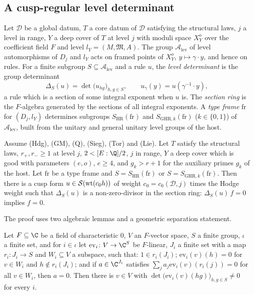 \subsection{A cusp-regular level determinant}\label{pf:lift1:cusp}

Let $\mathcal D$ be a global datum, $T$ a core datum of $\mathcal D$ satisfying the structural laws, $j$ a
level in range, $Y$ a deep cover of $T$ at level $j$ with moduli space $X^o_Y$ over the coefficient field
$F$ and level $l_Y=(M,\mathfrak M,A)$. The group $\mathcal A_{\mathrm{lev}}$ of level automorphisms of $D_j$ and
$l_Y$ acts on framed points of $X^o_Y$, $y\mapsto\gamma\cdot y$, and hence on rules. For a finite subgroup
$S\subseteq\mathcal A_{\mathrm{lev}}$ and a rule $u$, the \emph{level determinant} is the group determinant
\[
\Delta_S(u)=\det\bigl(u_{hg}\bigr)_{h,g\in S},\qquad u_\gamma(y)=u(\gamma^{-1}\cdot y),
\]
a rule which is a section of some integral exponent when $u$ is. The \emph{section ring} is the
$F$-algebra generated by the sections of all integral exponents. A \emph{type frame} $\mathrm{fr}$ for
$(D_j,l_Y)$ determines subgroups $S_{\mathrm{HR}}(\mathrm{fr})$ and $S_{\mathrm{GHR},k}(\mathrm{fr})$
($k\in\{0,1\}$) of $\mathcal A_{\mathrm{lev}}$, built from the unitary and general unitary level groups of the
host.

\begin{theorem}\label{pf:lift1:cusp-thm}
Assume (Hdg), (GM), (Q), (Sieg), (Tor) and (Lie). Let $T$ satisfy the structural laws,
$r_+,r_-\ge1$ at level $j$, $2<[E:\Q]/2$, $j$ in range, $Y$ a deep cover which is good with parameters
$(e,o)$, $e\ge4$, and $g_k>r+1$ for the auxiliary primes $g_k$ of the host. Let $\mathrm{fr}$ be a type frame and
$S=S_{\mathrm{HR}}(\mathrm{fr})$ or $S=S_{\mathrm{GHR},k}(\mathrm{fr})$. Then there is a cusp form
$u\in\mathcal S(\mathrm{wt}(c_0h))$ of weight $c_0=c_0(\mathcal D,j)$ times the Hodge weight such that
$\Delta_S(u)$ is a non-zero-divisor in the section ring: $\Delta_S(u)\,f=0$ implies $f=0$.
\end{theorem}

The proof uses two algebraic lemmas and a geometric separation statement.

\begin{lemma}\label{pf:lift1:groupdet}
Let $F\subseteq\C$ be a field of characteristic $0$, $V$ an $F$-vector space, $S$ a finite group, $\iota$
a finite set, and for $i\in\iota$ let $\mathrm{ev}_i\colon V\to\C^S$ be $F$-linear, $J_i$ a finite set with a
map $r_i\colon J_i\to S$ and $W_i\subseteq V$ a subspace, such that: $1\in r_i(J_i)$;
$\mathrm{ev}_i(v)(h)=0$ for $v\in W_i$ and $h\notin r_i(J_i)$; and if $a\in\C^{J_i}$ satisfies
$\sum_ja_j\mathrm{ev}_i(v)(r_i(j))=0$ for all $v\in W_i$, then $a=0$. Then there is $v\in V$ with
$\det\bigl(\mathrm{ev}_i(v)(hg)\bigr)_{h,g\in S}\ne0$ for every $i$.
\end{lemma}

